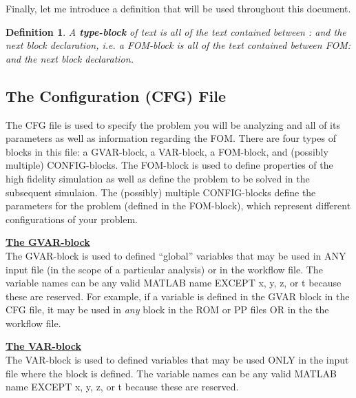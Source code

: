 \documentclass[notitlepage]{report}
\newtheorem{Def}{Definition}
\begin{document}
Finally, let me introduce a definition that will be used throughout this document.
\begin{Def}
  A \textbf{\emph{type}}\textbf{-block} of text is all of the text contained between : and the next block declaration, i.e. a FOM-block is all of the text contained between FOM: and the next block declaration.
\end{Def}

\subsection{The Configuration (CFG) File} 
The CFG file is used to specify the problem you will be analyzing and all of its parameters as well as information regarding the FOM.  There are four types of blocks in this file: a GVAR-block, a VAR-block, a FOM-block, and (possibly multiple) CONFIG-blocks.  The FOM-block is used to define properties of the high fidelity simulation as well as define the problem to be solved in the subsequent simulaion.  The (possibly) multiple CONFIG-blocks define the parameters for the problem (defined in the FOM-block), which represent different configurations of your problem.

\vspace{2mm}
\noindent \underline{\textbf{The GVAR-block }} \\
The GVAR-block is used to defined ``global'' variables that may be used in ANY input file (in the scope of a particular analysis) or in the workflow file.  The variable names can be any valid MATLAB name EXCEPT x, y, z, or t because these are reserved.  For example, if a variable is defined in the GVAR block in the CFG file, it may be used in \emph{any} block in the ROM or PP files OR in the the workflow file.

\vspace{2mm}
\noindent \underline{\textbf{The VAR-block }} \\
The VAR-block is used to defined variables that may be used ONLY in the input file where the block is defined.  The variable names can be any valid MATLAB name EXCEPT x, y, z, or t because these are reserved.
\end{document}
